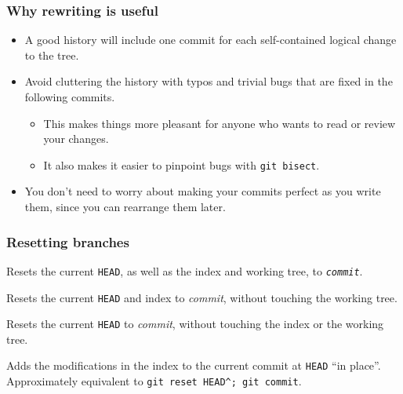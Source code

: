\documentclass{beamer}
\begin{document}
\begin{frame}
  \frametitle{Why rewriting is useful}

  \begin{itemize}
  \item A good history will include one commit for each self-contained
    logical change to the tree.
  \item Avoid cluttering the history with typos and trivial bugs that
    are fixed in the following commits.
    \begin{itemize}
    \item This makes things more pleasant for anyone who wants to read
      or review your changes.
    \item It also makes it easier to pinpoint bugs with \texttt{git
        bisect}.
    \end{itemize}
  \item You don't need to worry about making your commits perfect as
    you write them, since you can rearrange them later.
  \end{itemize}
\end{frame}

\begin{frame}
  \frametitle{Resetting branches}

  \begin{description}
  \item[\texttt{git reset --hard \textit{commit}}] Resets the current
    \texttt{HEAD}, as well as the index and working tree, to
    \texttt{\textit{commit}}.
  \item[\texttt{git reset \textit{commit}}] Resets the current
    \texttt{HEAD} and index to \textit{commit}, without touching the
    working tree.
  \item[\texttt{git reset --soft \textit{commit}}] Resets the current
    \texttt{HEAD} to \textit{commit}, without touching the index or
    the working tree.
  \item[\texttt{git commit --amend}] Adds the modifications in the
    index to the current commit at \texttt{HEAD} ``in place''.
    Approximately equivalent to \texttt{git reset
      HEAD\textasciicircum; git commit}.
  \end{description}
\end{frame}
\end{document}
